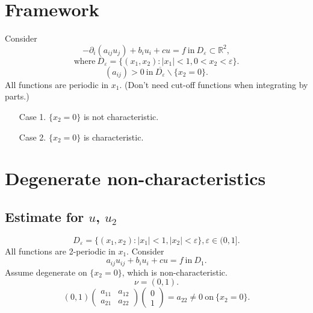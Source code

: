 \documentclass[12pt]{article}
\begin{document}
\newpage

\section{Framework}
Consider
\[ -\partial_i(a_{ij}u_j) + b_iu_i + cu = f \mathrm{\ in\ } D_\varepsilon \subset \mathbb{R}^2, \]
\[ \mathrm{where\ } D_\varepsilon = \{ (x_1, x_2): |x_1|<1, 0<x_2<\varepsilon \} .\]
\[ (a_{ij})>0 \mathrm{\ in\ } \overline{D_\varepsilon}\backslash \{ x_2 = 0 \}. \]
All functions are periodic in $x_1$. (Don't need cut-off functions when integrating by parts.)

\begin{enumerate}
\item[Case 1.] $\{x_2 = 0\}$ is not characteristic.
\item[Case 2.] $\{x_2=0\}$ is characteristic.
\end{enumerate}


\newpage
\section{Degenerate non-characteristics}
\subsection{Estimate for $u$, $u_2$}
\[ D_\varepsilon = \{ (x_1, x_2): |x_1| < 1,  |x_2| < \varepsilon \}, \varepsilon \in (0, 1]. \]
All functions are 2-periodic in $x_1$. Consider 
\[ a_{ij}u_{ij}+b_iu_i + cu = f \ \mathrm{in\ } D_1. \]
Assume degenerate on $ \{ x_2 = 0 \} $, which is non-characteristic.
\[ \nu = (0, 1). \]
\[
(0, 1) \left(
\begin{array}{cc}
	a_{11} & a_{12}\\
	a_{21} & a_{22}
\end{array}
\right)\left(
\begin{array}{c}
	0\\
	1
\end{array}
\right)=a_{22}
\ne 0 \mathrm{\ on\ } \{ x_2 = 0 \}.
\]
\end{document}
